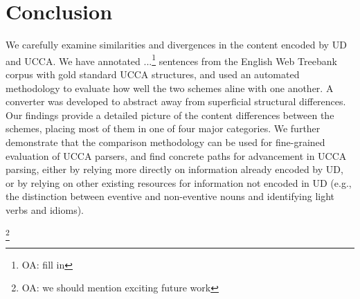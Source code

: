 \documentclass[11pt,a4paper]{article}
\newcommand{\oa}[1]{\footnote{\color{red}OA: #1}}
\begin{document}
%
%
%
%


\section{Conclusion}\label{sec:conclusion}

We carefully examine similarities and divergences in the content encoded by UD and UCCA. We have annotated ...\oa{fill in}
sentences from the English Web Treebank corpus with gold standard UCCA structures, and used an automated methodology to
evaluate how well the two schemes aline with one another. A converter was developed to abstract away from superficial structural
differences. Our findings provide a detailed picture of the content differences between the schemes, placing most of them
in one of four major categories. We further demonstrate that the comparison methodology can be used for fine-grained
evaluation of UCCA parsers, and find concrete paths for advancement in UCCA parsing, either by relying more directly on 
information already encoded by UD, or by relying on other existing resources for information not encoded in UD (e.g.,
the distinction between eventive and non-eventive nouns and identifying light verbs and idioms).

\oa{we should mention exciting future work}






\end{document}
